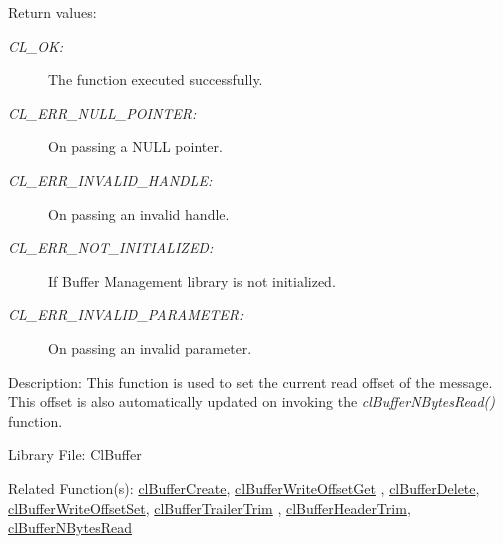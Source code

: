 \begin{Desc}
\item[Return values:]
\begin{description}
\item[{\em CL\_\-OK:}]The function executed successfully. \item[{\em CL\_\-ERR\_\-NULL\_\-POINTER:}]On passing a NULL pointer. \item[{\em CL\_\-ERR\_\-INVALID\_\-HANDLE:}]On passing an invalid handle. \item[{\em CL\_\-ERR\_\-NOT\_\-INITIALIZED:}]If Buffer Management library is not initialized. \item[{\em CL\_\-ERR\_\-INVALID\_\-PARAMETER:}]On passing an invalid parameter.\end{description}
\end{Desc}
\begin{Desc}
\item[Description:]This function is used to set the current read offset of the message. This offset is also automatically updated on invoking the \textit{clBufferNBytesRead()} function.\end{Desc}
\begin{Desc}
\item[Library File:]Cl\-Buffer\end{Desc}
\begin{Desc}
\item[Related Function(s):]\hyperlink{pagebuf103}{cl\-Buffer\-Create}, \hyperlink{pagebuf118}{cl\-Buffer\-Write\-Offset\-Get} , 
\hyperlink{pagebuf105}{cl\-Buffer\-Delete}, \hyperlink{pagebuf120}{cl\-Buffer\-Write\-Offset\-Set}, 
\hyperlink{pagebuf125}{cl\-Buffer\-Trailer\-Trim} , \hyperlink{pagebuf124}{cl\-Buffer\-Header\-Trim}, 
\hyperlink{pagebuf108}{cl\-Buffer\-NBytes\-Read} \end{Desc}


\newpage
